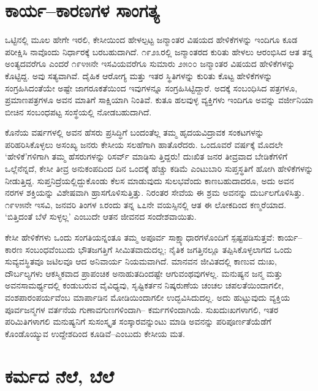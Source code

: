 \section*{ಕಾರ್ಯ–ಕಾರಣಗಳ ಸಾಂಗತ್ಯ}


ಒಟ್ಟಿನಲ್ಲಿ ಮೂಲ ಹೇಗೇ ಇರಲಿ, ಕೇಸೀಯಿಂದ ಹೇಳಲ್ಪಟ್ಟ ಜನ್ಮಾಂತರ ವಿಷಯದ ಹೇಳಿಕೆಗಳನ್ನು ಇಂದಿಗೂ ಕೂಡ ಪರೀಕ್ಷಿಸಿ ನಾವೊಂದು ನಿರ್ಧಾರಕ್ಕೆ ಬರಬಹುದಾಗಿದೆ. ೧೯೨೩ರಲ್ಲಿ ಜನ್ಮಾಂತರದ ಕುರಿತು ಹೇಳಲು ಆರಂಭಿಸಿದ ಆತ ತನ್ನ ಅಂತ್ಯದವರೆಗೂ ಎಂದರೆ ೧೯೪೫ನೇ ಇಸವಿಯವರೆಗೂ ಸುಮಾರು ೨೫೦೦ ಜನ್ಮಾಂತರ ವಿಷಯದ ಹೇಳಿಕೆಗಳನ್ನು ಕೊಟ್ಟಿದ್ದ. ಅವು ಸತ್ಯವಾಗಿವೆ. ದೈಹಿಕ ಆರೋಗ್ಯ ಮತ್ತು ಇತರ ಸ್ಥಿತಿಗಳನ್ನು ಕುರಿತು ಕೊಟ್ಟ ಹೇಳಿಕೆಗಳನ್ನು ಸಂಗ್ರಹಿಸಿದಂತೆಯೇ ಅಷ್ಟೇ ಜಾಗರೂಕತೆಯಿಂದ ಇವುಗಳನ್ನೂ ಸಂಗ್ರಹಿಸಿಟ್ಟಿದ್ದಾರೆ. ಅದಕ್ಕೆ ಸಂಬಂಧಿಸಿದ ಪತ್ರಗಳೂ, ಪ್ರಮಾಣಪತ್ರಗಳೂ ಅವನ ಮಾತಿಗೆ ಸಾಕ್ಷಿಯಾಗಿ ನಿಂತಿವೆ. ಕುತೂ ಹಲವುಳ್ಳ ವ್ಯಕ್ತಿಗಳು ಇಂದಿಗೂ ಅವನ್ನು ವರ್ಜೀನಿಯಾ ಬೀಚಿನ ಸಂಬಂಧಪಟ್ಟ ಸಂಸ್ಥೆಯಲ್ಲಿ ನೋಡಬಹುದಾಗಿದೆ.

ಕೊನೆಯ ವರ್ಷಗಳಲ್ಲಿ ಅವನ ಹೆಸರು ಪ್ರಸಿದ್ಧಿಗೆ ಬಂದಂತೆಲ್ಲ ತಮ್ಮ ಹೃದಯವಿದ್ರಾವಕ ಸಂಕಟಗಳನ್ನು ಪರಿಹರಿಸಿಕೊಳ್ಳಲು ಅಸಂಖ್ಯ ಜನರು ಕೇಸೀಯ ಸಲಹೆಗಾಗಿ ಹಾತೊರೆದರು. ಒಂದೂವರೆ ವರ್ಷಕ್ಕೆ ಮೊದಲೇ ‘ಹೇಳಿಕೆ’ಗಳಿಗಾಗಿ ತಮ್ಮ ಹೆಸರುಗಳನ್ನು ರಿಸರ್ವ್ ಮಾಡಿಸು ತ್ತಿದ್ದರು! ದುಃಖಿತ ಜನರ ತೀವ್ರವಾದ ಬೇಡಿಕೆಗಳಿಗೆ ಒಲ್ಲೆನೆನ್ನದೆ, ಕೇಸೀ ತೀವ್ರ ಅನುಕಂಪದಿಂದ ದಿನ ಒಂದಕ್ಕೆ ಹೆಚ್ಚು ಕಡಿಮೆ ಎಂಟುಬಾರಿ ಸುಪ್ತಸ್ಥತಿಗೆ ಹೋಗಿ ಹೇಳಿಕೆಗಳನ್ನು ನೀಡುತ್ತಿದ್ದ. ಸುಪ್ತನಿದ್ರೆಯಲ್ಲಿದ್ದುಕೊಂಡು ಕೆಲಸ ಮಾಡುವುದು ಸುಲಭವೆಂದು ಕಾಣಬಹುದಾದರೂ, ಅದು ಅವನ ನರಗಳ ಶಕ್ತಿಯನ್ನು ವಿಶೇಷವಾಗಿ ಹ್ರಾಸಗೊಳಿಸುತ್ತಿತ್ತು. ನಿರಂತರ ಸೇವೆಯ ಈ ಶ್ರಮ ಅವನನ್ನು ದುರ್ಬಲಗೊಳಿಸಿತ್ತು. ೧೯೪೫ನೇ ಇಸವಿ, ಜನವರಿ ತಿಂಗಳ ೩ರಂದು ತನ್ನ ೬೭ನೇ ವಯಸ್ಸಿನಲ್ಲಿ ಆತ ಈ ಲೋಕದಿಂದ ಕಣ್ಮರೆಯಾದ. ‘ಬಿತ್ತಿದಂತೆ ಬೆಳೆ ಸುಳ್ಳಲ್ಲ’ ಎಂಬುದೇ ಆತನ ಜೀವನದ ಸಂದೇಶವಾಯಿತು.

ಕೇಸೀ ಹೇಳಿಕೆಗಳು ಒಂದು ಸಂಗತಿಯನ್ನಂತೂ ತಮ್ಮ ಅಪೂರ್ವ ಸಾಕ್ಷ್ಯಾಧಾರಗಳೊಂದಿಗೆ ಸ್ಪಷ್ಟಪಡಿಸುತ್ತವೆ: ಕಾರ್ಯ–ಕಾರಣ ಸಂಬಂಧವೆಂಬುದು ಭೌತಜಗತ್ತಿಗೆ ಸೀಮಿತವಾದುದಲ್ಲ; ನೈತಿಕ ಜಗತ್ತಿನಲ್ಲೂ ತಪ್ಪಿಸಿಕೊಳ್ಳಲಾಗದ ಒಂದು ಸುವ್ಯವಸ್ಥಿತವೂ ಜಟಿಲವೂ ಆದ ಅನಿವಾರ್ಯ ನಿಯಮವಾಗಿದೆ. ಮಾನವನ ಜೀವಿತದಲ್ಲಿ ಕಾಣುವ ದುಃಖ, ದೌರ್ಬಲ್ಯಗಳು ಆಕಸ್ಮಿಕವಾದ ಪ್ರಾಪಂಚಿಕ ಅನಾಹುತದಿಂದಷ್ಟೇ ಆಗುವಂಥವುಗಳಲ್ಲ. ಮನುಷ್ಯನ ಜನ್ಮ ಮತ್ತು ಅವನ\break ಸಾಮರ್ಥ್ಯದಲ್ಲಿ ಕಂಡುಬರುವ ವೈವಿಧ್ಯವು, ಸೃಷ್ಟಿಕರ್ತನ ನಿಷ್ಕರುಣೆಯ ಚಂಚಲ ಚಪಲತೆ\-ಯಿಂದಾ\-ಗಲೀ, ವಂಶಪಾರಂಪರ್ಯವೆಂಬ ಮಾರ್ಪಾಡಿನ ಮೋಡಿಯಿಂದಾಗಲೀ ಉದ್ಭವಿಸಿದುದಲ್ಲ. ಅದು ಹುಟ್ಟುವುದು ವ್ಯಕ್ತಿಯ ಪೂರ್ವಜನ್ಮಗಳ ವರ್ತನೆಯ ಗುಣಾವಗುಣಗಳಿಂದಾಗಿ– ಕರ್ಮಗಳಿಂ\-ದಾಗಿಯೆ. ಸುಖದುಃಖಗಳಾಗಲಿ, ಇತರ ಪರಿಮಿತಿಗಳಾಗಲಿ ಮನುಷ್ಯನಿಗೆ ಸುಸಂಸ್ಕೃತ ಸಂಸ್ಕಾರ\-ವನ್ನುಂಟು ಮಾಡಿ ಅವನನ್ನು ಪರಿಪೂರ್ಣತೆಯೆಡೆಗೆ ಕೊಂಡೊಯ್ಯುವ ಉದ್ದೇಶದಿಂದ ಕೂಡಿವೆ–ಎಂಬುದು ಕೇಸೀಯ ಮತ.


\section*{ಕರ್ಮದ ನೆಲೆ, ಬೆಲೆ}


